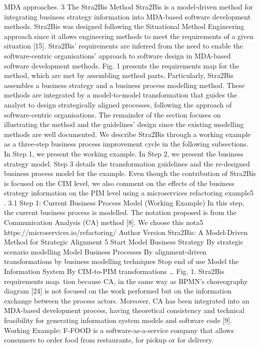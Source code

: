 MDA approaches.
3 The Stra2Bis Method
Stra2Bis is a model-driven method for integrating business strategy information
into MDA-based software development methods. Stra2Bis was designed following the Situational Method Engineering approach since it allows engineering
methods to meet the requirements of a given situation [15]. Stra2Bis’ requirements are inferred from the need to enable the software-centric organisations’
approach to software design in MDA-based software development methods. Fig.
1 presents the requirements map for the method, which are met by assembling
method parts. Particularly, Stra2Bis assembles a business strategy and a business
process modelling method. These methods are integrated by a model-to-model
transformation that guides the analyst to design strategically aligned processes,
following the approach of software-centric organisations.
The remainder of the section focuses on illustrating the method and the
guidelines’ design since the existing modelling methods are well documented. We
describe Stra2Bis through a working example as a three-step business process
improvement cycle in the following subsections. In Step 1, we present the working
example. In Step 2, we present the business strategy model. Step 3 details the
transformation guidelines and the re-designed business process model for the
example. Even though the contribution of Stra2Bis is focused on the CIM level,
we also comment on the effects of the business strategy information on the PIM
level using a microservices refactoring example5
.
3.1 Step 1: Current Business Process Model (Working Example)
In this step, the current business process is modelled. The notation proposed
is from the Communication Analysis (CA) method [8]. We choose this nota5 https://microservices.io/refactoring/
Author Version
Stra2Bis: A Model-Driven Method for Strategic Alignment 5
Start
Model
Business
Strategy
By strategic scenario
modelling
Model
Business
Processes
By alignment-driven
transformations
by business modelling
techniques
Stop
end of use
Model the
Information
System
By CIM-to-PIM
transformations
…
Fig. 1. Stra2Bis requirements map.
tion because CA, in the same way as BPMN’s choreography diagram [24] is
not focused on the work performed but on the information exchange between
the process actors. Moreover, CA has been integrated into an MDA-based development process, having theoretical consistency and technical feasibility for
generating information system models and software code [9].
Working Example: F-FOOD is a software-as-a-service company that allows consumers to order food from restaurants, for pickup or for delivery.
